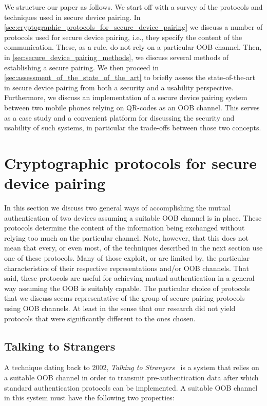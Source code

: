 \documentclass[conference, 11pt]{sty/IEEEtran}
\begin{document}
We structure our paper as follows.
We start off with a survey of the protocols and techniques used in secure device pairing.
In \autoref{sec:cryptographic_protocols_for_secure_device_pairing} we discuss a number of protocols used for secure device pairing, i.e., they specify the content of the communication.
These, as a rule, do not rely on a particular OOB channel.
Then, in \autoref{sec:secure_device_pairing_methods}, we discuss several methods of establishing a secure pairing.
We then proceed in \autoref{sec:assessment_of_the_state_of_the_art} to briefly assess the state-of-the-art in secure device pairing from both a security and a usability perspective.
Furthermore, we discuss an implementation of a secure device pairing system between two mobile phones relying on QR-codes as an OOB channel.
This serves as a case study and a convenient platform for discussing the security and usability of such systems, in particular the trade-offs between those two concepts.

\section{Cryptographic protocols for secure device pairing}
\label{sec:cryptographic_protocols_for_secure_device_pairing}

In this section we discuss two general ways of accomplishing the mutual authentication of two devices assuming a suitable OOB channel is in place.
These protocols determine the content of the information being exchanged without relying too much on the particular channel.
Note, however, that this does not mean that every, or even most, of the techniques described in the next section use one of these protocols.
Many of those exploit, or are limited by, the particular characteristics of their respective representations and/or OOB channels.
That said, these protocols are useful for achieving mutual authentication in a general way assuming the OOB is suitably capable.
The particular choice of protocols that we discuss seems representative of the group of secure pairing protocols using OOB channels.
At least in the sense that our research did not yield protocols that were significantly different to the ones chosen.

\subsection{Talking to Strangers}
\label{ssec:talking_to_strangers}

A technique dating back to 2002, \emph{Talking to Strangers}~\cite{balfanz2002talking} is a system that relies on a suitable OOB channel in order to transmit pre-authentication data after which standard authentication protocols can be implemented.
A suitable OOB channel in this system must have the following two properties:
\end{document}
